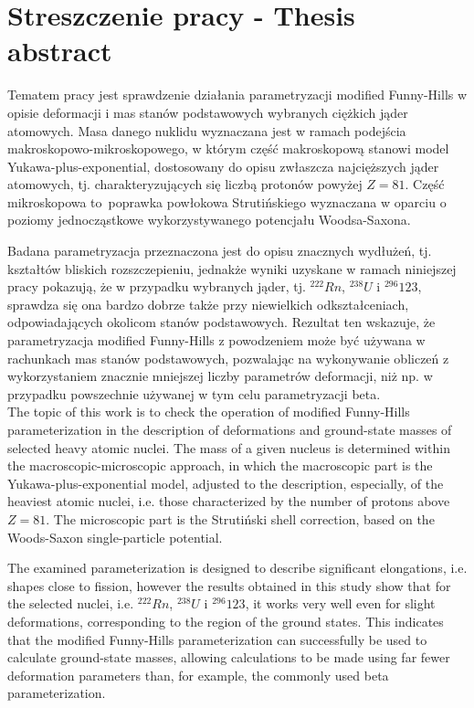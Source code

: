\documentclass[a4paper,polish,twoside]{article}
\numberwithin{equation}{section}
\begin{document}

\section{Streszczenie pracy - Thesis abstract}

Tematem pracy jest sprawdzenie działania parametryzacji modified Funny-Hills w opisie deformacji i mas stanów podstawowych wybranych ciężkich jąder atomowych. Masa danego nuklidu wyznaczana jest w ramach podejścia makroskopowo-mikroskopowego, w którym część makroskopową stanowi model Yukawa-plus-exponential, dostosowany do opisu zwłaszcza najcięższych jąder atomowych, tj. charakteryzujących się liczbą protonów powyżej $Z=81$. Część mikroskopowa to~poprawka powłokowa Strutińskiego wyznaczana w oparciu o poziomy jednocząstkowe wykorzystywanego potencjału Woodsa-Saxona.

Badana parametryzacja przeznaczona jest do opisu znacznych wydłużeń, tj. kształtów bliskich rozszczepieniu, jednakże wyniki uzyskane w ramach niniejszej pracy pokazują, że w przypadku wybranych jąder, tj. $^{222}Rn$, $^{238}U$ i $^{296}123$, sprawdza się ona bardzo dobrze także przy niewielkich odkształceniach, odpowiadających okolicom stanów podstawowych. Rezultat ten wskazuje, że parametryzacja modified Funny-Hills z powodzeniem może być używana w rachunkach mas stanów podstawowych, pozwalając na wykonywanie obliczeń z wykorzystaniem znacznie mniejszej liczby parametrów deformacji, niż np. w przypadku powszechnie używanej w tym celu parametryzacji beta.
\\

The topic of this work is to check the operation of modified Funny-Hills parameterization in the description of deformations and ground-state masses of selected heavy atomic nuclei. The mass of a given nucleus is determined within the macroscopic-microscopic approach, in which the macroscopic part is the Yukawa-plus-exponential model, adjusted to the description, especially, of the heaviest atomic nuclei, i.e. those characterized by the number of protons above $Z=81$. The microscopic part is the Strutiński shell correction, based on the Woods-Saxon single-particle potential.

The examined parameterization is designed to describe significant elongations, i.e. shapes close to fission, however the results obtained in this study show that for the selected nuclei, i.e. $^{222}Rn$, $^{238}U$ i $^{296}123$, it works very well even for slight deformations, corresponding to the region of the ground states. This indicates that the modified Funny-Hills parameterization can successfully be used to calculate ground-state masses, allowing calculations to be made using far fewer deformation parameters than, for example, the commonly used beta parameterization.
\end{document}
